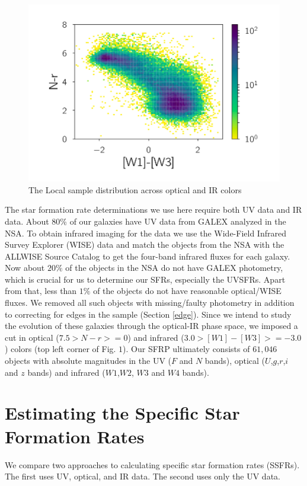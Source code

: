 \begin{figure}
\includegraphics[width=\textwidth]{figures/sample}
\caption[Short figure name.]{The Local sample distribution across optical and IR colors
\label{fig:myInlineFigure}}
\end{figure}

The star formation rate determinations we use here require both UV data and IR data. About 80\% of our galaxies have UV data from GALEX analyzed in the NSA. To obtain infrared imaging for the data we use the Wide-Field Infrared Survey Explorer (WISE) data and match the objects from the NSA with the ALLWISE Source Catalog to get the four-band infrared fluxes for each galaxy. Now about $20\%$ of the objects in the NSA do not have GALEX photometry, which is crucial for us to determine our SFRs, especially the UVSFRs. Apart from that, less than $1\%$ of the objects do not have reasonable optical/WISE fluxes. We removed all such objects with missing/faulty photometry in addition to correcting for edges in the sample (Section \ref{edge}). Since we intend to study the evolution of these galaxies through the optical-IR phase space, we imposed a cut in optical ($7.5> N-r >=0 $) and infrared ($3.0> [W1]- [W3] >= -3.0$) colors (top left corner of Fig. $1$). Our SFRP ultimately consists of $61,046$ objects with absolute magnitudes in the UV ($F$ and $N$ bands), optical ($U$,$g$,$r$,$i$ and $z$ bands) and infrared ($W1$,$W2$, $W3$ and $W4$ bands).\\

\section{Estimating the Specific Star Formation Rates}
We compare two approaches to calculating specific star formation rates (SSFRs). The first uses UV, optical, and IR data. The second uses only the UV data.

